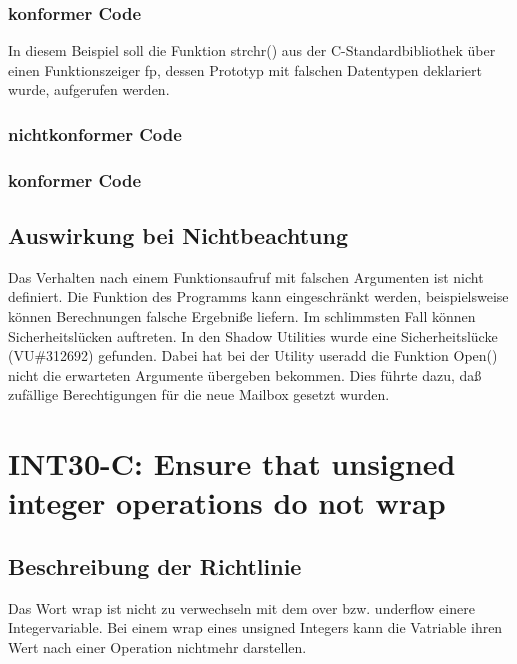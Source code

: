 \documentclass[12pt]{article}
\begin{document}
\subsubsection{konformer Code}

	In diesem Beispiel soll die Funktion strchr() aus der C-Standardbibliothek \"uber einen Funktionszeiger fp, dessen Prototyp mit falschen Datentypen deklariert wurde, aufgerufen werden.

\subsubsection{nichtkonformer Code}

\subsubsection{konformer Code}


\subsection{Auswirkung bei Nichtbeachtung}
Das Verhalten nach einem Funktionsaufruf mit falschen Argumenten ist nicht definiert. Die Funktion des Programms kann eingeschr\"ankt werden, beispielsweise k\"onnen Berechnungen falsche Ergebni{\ss}e liefern. Im schlimmsten Fall k\"onnen Sicherheitsl\"ucken auftreten. In den Shadow Utilities wurde eine Sicherheitsl\"ucke (VU\#312692) gefunden. Dabei hat bei der Utility useradd die Funktion Open() nicht die erwarteten Argumente \"ubergeben bekommen. Dies f\"uhrte dazu, da{\ss} zuf\"allige Berechtigungen f\"ur die neue Mailbox gesetzt wurden.

\newpage
\section{INT30-C: Ensure that unsigned integer operations do not wrap}
\subsection{Beschreibung der Richtlinie}
Das Wort wrap ist nicht zu verwechseln mit dem over bzw. underflow einere Integervariable. Bei einem wrap eines unsigned Integers kann die Vatriable ihren Wert nach einer Operation nichtmehr darstellen. 
\end{document}
